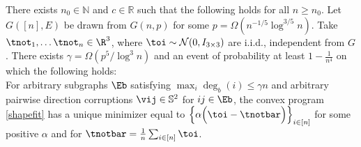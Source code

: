 \begin{theorem} \label{thm-3d} 
There exists $n_0 \in \mathbb{N}$ and $c \in \mathbb{R}$ such that the following holds for all $n \ge n_0$.
Let $G([n],E)$ be drawn from $G(n,p)$ for some $p = \Omega( n^{-1/5} \log^{3/5} n)$. Take $ \tnot_1, \ldots \tnot_n  \in \R^3$, where $\toi \sim \mathcal{N}(0, I_{3 \times 3})$ are i.i.d., independent from $G$. 
There exists $\gamma = \Omega(p^5 / \log^3 n)$ and an event of probability at least  $1- \frac{1}{n^{4}}$ %
on which the following holds:\\[1em]
For arbitrary  subgraphs $\Eb$ satisfying $\max_i \deg_b(i) \leq \gamma n$ and arbitrary pairwise direction corruptions $\vij \in \mathbb{S}^2$ for $ij \in \Eb$,  the convex program \eqref{shapefit} has a unique minimizer equal to $\left \{\alpha \Bigl(\toi - \tnotbar \Bigr)\right\}_{i \in [n]}$ for some positive $\alpha$ and for $\tnotbar = \frac{1}{n}\sum_{i\in [n]} \toi$. 
\end{theorem}
%


